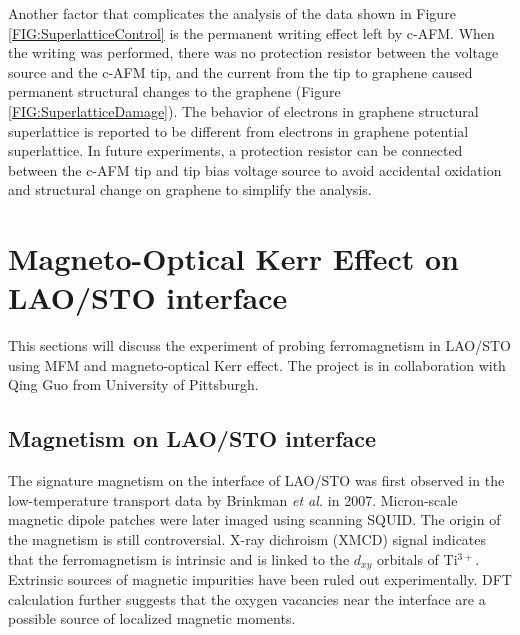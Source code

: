 \documentclass[pdflatex, sectionletters, 12pt]{pittetd}    %
\begin{document}
Another factor that complicates the analysis of the data shown in Figure \ref{FIG:SuperlatticeControl} is the permanent writing effect left by c-AFM. When the writing was performed, there was no protection resistor between the voltage source and the c-AFM tip, and the current from the tip to graphene caused permanent structural changes to the graphene (Figure \ref{FIG:SuperlatticeDamage}). The behavior of electrons in graphene structural superlattice is reported to be different from electrons in graphene potential superlattice\cite{jessen2019lithographic}. In future experiments, a protection resistor can be connected between the c-AFM tip and tip bias voltage source to avoid accidental oxidation and structural change on graphene to simplify the analysis.

\chapter{Magneto-Optical Kerr Effect on LAO/STO interface}
\label{SEC:Kerr}

This sections will discuss the experiment of probing ferromagnetism in LAO/STO using MFM and magneto-optical Kerr effect. The project is in collaboration with Qing Guo from University of Pittsburgh.

\section{Magnetism on LAO/STO interface}

The signature magnetism on the interface of LAO/STO was first observed in the low-temperature transport data by Brinkman \textit{et al.} in 2007\cite{brinkman2007magnetic}. Micron-scale magnetic dipole patches were later imaged using scanning SQUID\cite{bert2011direct, kalisky2012scanning, kalisky2012critical}. The origin of the magnetism is still controversial. X-ray dichroism (XMCD) signal indicates that the ferromagnetism is intrinsic and is linked to the $d_{xy}$ orbitals of Ti$^{3+}$\cite{lee2013titanium}. Extrinsic sources of magnetic impurities have been ruled out experimentally\cite{brinkman2007magnetic, lee2013titanium, ariando2011electronic}. DFT calculation further suggests that the oxygen vacancies near the interface are a possible source of localized magnetic moments\cite{pentcheva2006charge}. 
\end{document}
